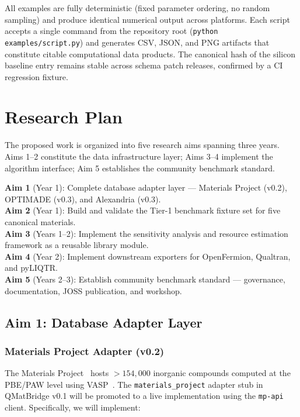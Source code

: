 \documentclass[11pt]{article}
\begin{document}
All examples are fully deterministic (fixed parameter ordering, no random
sampling) and produce identical numerical output across platforms.
Each script accepts a single command from the repository root
(\texttt{python examples/script.py}) and generates CSV, JSON, and PNG
artifacts that constitute citable computational data products.
The canonical hash of the silicon baseline entry remains stable across
schema patch releases, confirmed by a CI regression fixture.

\section{Research Plan}

The proposed work is organized into five research aims spanning three years.
Aims 1--2 constitute the data infrastructure layer; Aims 3--4 implement the
algorithm interface; Aim 5 establishes the community benchmark standard.

\begin{mdframed}[style=aimbox]
\textbf{Aim 1} (Year 1): Complete database adapter layer ---
Materials Project (v0.2), OPTIMADE (v0.3), and Alexandria (v0.3).\\
\textbf{Aim 2} (Year 1): Build and validate the Tier-1 benchmark fixture
set for five canonical materials.\\
\textbf{Aim 3} (Years 1--2): Implement the sensitivity analysis and
resource estimation framework as a reusable library module.\\
\textbf{Aim 4} (Year 2): Implement downstream exporters for OpenFermion,
Qualtran, and pyLIQTR.\\
\textbf{Aim 5} (Years 2--3): Establish community benchmark standard ---
governance, documentation, JOSS publication, and workshop.
\end{mdframed}

\subsection{Aim 1: Database Adapter Layer}

\subsubsection{Materials Project Adapter (v0.2)}

The Materials Project~\cite{Jain2013} hosts $> 154{,}000$ inorganic
compounds computed at the PBE/PAW level using VASP~\cite{Kresse1996}.
The \texttt{materials\_project} adapter stub in QMatBridge v0.1 will be
promoted to a live implementation using the \texttt{mp-api} client.
Specifically, we will implement:
\end{document}
